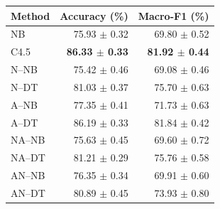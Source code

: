\begin{tabular}{lrr}
\toprule
Method & Accuracy (\%) & Macro-F1 (\%) \\
\midrule
NB & 75.93 $\pm$ 0.32 & 69.80 $\pm$ 0.52 \\
C4.5 & \textbf{86.33 $\pm$ 0.33} & \textbf{81.92 $\pm$ 0.44} \\
N--NB & 75.42 $\pm$ 0.46 & 69.08 $\pm$ 0.46 \\
N--DT & 81.03 $\pm$ 0.37 & 75.70 $\pm$ 0.63 \\
A--NB & 77.35 $\pm$ 0.41 & 71.73 $\pm$ 0.63 \\
A--DT & 86.19 $\pm$ 0.33 & 81.84 $\pm$ 0.42 \\
NA--NB & 75.63 $\pm$ 0.45 & 69.60 $\pm$ 0.72 \\
NA--DT & 81.21 $\pm$ 0.29 & 75.76 $\pm$ 0.58 \\
AN--NB & 76.35 $\pm$ 0.34 & 69.91 $\pm$ 0.60 \\
AN--DT & 80.89 $\pm$ 0.45 & 73.93 $\pm$ 0.80 \\
\bottomrule
\end{tabular}
